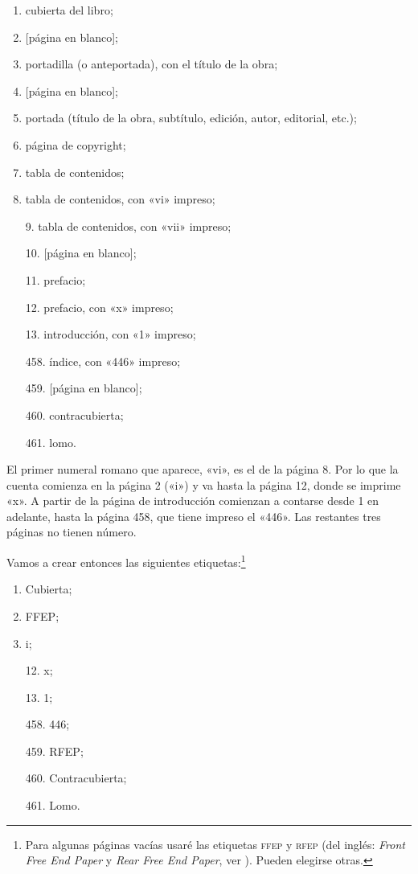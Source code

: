 \documentclass[%
	a5paper,
	10pt,
	twoside,
	openright,
	final,
]{memoir}
\begin{document}
	\begin{multicols}{2}
		\begin{enumerate}[noitemsep]
			\item cubierta del libro;
			\item {[página en blanco]};
			\item portadilla (o anteportada), con el título de la obra;
			\item {[página en blanco]};
			\item portada (título de la obra, subtítulo, edición, autor, editorial, etc.);
			\item página de copyright;
			\item tabla de contenidos;
			\item tabla de contenidos, con «vi» impreso;
			\item[9.] tabla de contenidos, con «vii» impreso;
			\item[10.] {[página en blanco]};
			\item[11.] prefacio;
			\item[12.] prefacio, con «x» impreso;
			\item[13.] introducción, con «1» impreso;
			\item[] \raisebox{.2em}{\ldots}
			\item[458.] índice, con «446» impreso;
			\item[459.] {[página en blanco]};
			\item[460.] contracubierta;
			\item[461.] lomo.
		\end{enumerate}
	\end{multicols}

	El primer numeral romano que aparece, «vi», es el de la página 8. Por lo que la cuenta comienza en la página 2 («i») y va hasta la página 12, donde se imprime «x». A partir de la página de introducción comienzan a contarse desde 1 en adelante, hasta la página 458, que tiene impreso el «446». Las restantes tres páginas no tienen número.

	Vamos a crear entonces las siguientes etiquetas:\footnote{Para algunas páginas vacías usaré las etiquetas \textsc{ffep} y \textsc{rfep} (del inglés: \emph{Front Free End Paper} y \emph{Rear Free End Paper}, ver \cite{FFEP}). Pueden elegirse otras.}

	\begin{multicols}{2}
		\begin{enumerate}[noitemsep]
			\item Cubierta;
			\item FFEP;%
			\item i;
			\item[] \raisebox{.2em}{\ldots}
			\item[12.] x;
			\item[13.] 1;
			\item[] \raisebox{.2em}{\ldots}
			\item[458.] 446;
			\item[459.] RFEP;
			\item[460.] Contracubierta;
			\item[461.] Lomo.
		\end{enumerate}
	\end{multicols}
\end{document}
